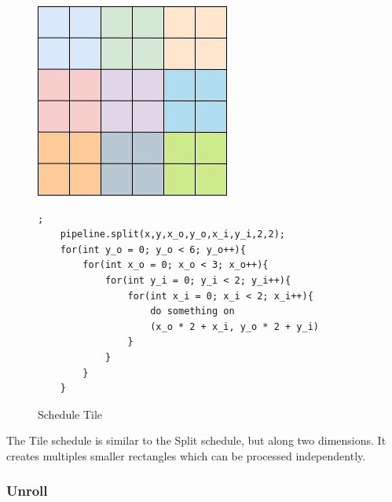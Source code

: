 \begin{figure}[H]

		\begin{minipage}[c]{\EIW}
			\centering
		\includegraphics[width=\textwidth]{Images/Tile.png}
		\end{minipage}
		\begin{minipage}[c]{\ECW}
			\centering
			\begin{lstlisting}[label={code:reorder}];
	pipeline.split(x,y,x_o,y_o,x_i,y_i,2,2);
	for(int y_o = 0; y_o < 6; y_o++){
		for(int x_o = 0; x_o < 3; x_o++){
			for(int y_i = 0; y_i < 2; y_i++){
				for(int x_i = 0; x_i < 2; x_i++){
					do something on
					(x_o * 2 + x_i, y_o * 2 + y_i)
				}
			}
		}
	}
\end{lstlisting}
		\end{minipage}
		\caption{Schedule Tile}
\end{figure}
	The Tile schedule is similar to the Split schedule, but along two dimensions. It creates multiples smaller rectangles which can be processed independently.

	\subsubsection{Unroll}


